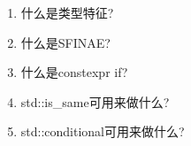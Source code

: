 \begin{enumerate}
\item
什么是类型特征?

\item
什么是SFINAE?

\item
什么是constexpr if?

\item
std::is\_same可用来做什么?

\item
std::conditional可用来做什么?
\end{enumerate}